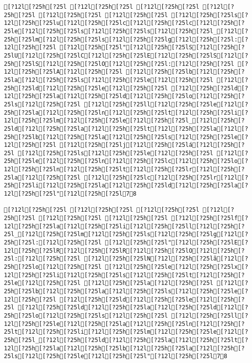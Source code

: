 \documentclass{scrartcl}
\begin{document}
\begin{Verbatim}
[?12l[?25h[?25l [?12l[?25h[?25l [?12l[?25h[?25l [?12l[?25h[?25l [?12l[?25h[?25l [?12l[?25h[?25l [?12l[?25h[?25ls[?12l[?25h[?25lu[?12l[?25h[?25lc[?12l[?25h[?25lc[?12l[?25h[?25le[?12l[?25h[?25ls[?12l[?25h[?25ls[?12l[?25h[?25l_[?12l[?25h[?25lm[?12l[?25h[?25ls[?12l[?25h[?25lg[?12l[?25h[?25l:[?12l[?25h[?25l [?12l[?25h[?25l"[?12l[?25h[?25lS[?12l[?25h[?25lU[?12l[?25h[?25lC[?12l[?25h[?25lE[?12l[?25h[?25lS[?12l[?25h[?25lS[?12l[?25h[?25lO[?12l[?25h[?25l:[?12l[?25h[?25l [?12l[?25h[?25lA[?12l[?25h[?25l [?12l[?25h[?25lb[?12l[?25h[?25la[?12l[?25h[?25ls[?12l[?25h[?25le[?12l[?25h[?25l [?12l[?25h[?25ld[?12l[?25h[?25le[?12l[?25h[?25l [?12l[?25h[?25ld[?12l[?25h[?25la[?12l[?25h[?25ld[?12l[?25h[?25lo[?12l[?25h[?25ls[?12l[?25h[?25l [?12l[?25h[?25ll[?12l[?25h[?25le[?12l[?25h[?25la[?12l[?25h[?25ln[?12l[?25h[?25lt[?12l[?25h[?25li[?12l[?25h[?25lm[?12l[?25h[?25le[?12l[?25h[?25l_[?12l[?25h[?25ld[?12l[?25h[?25la[?12l[?25h[?25lt[?12l[?25h[?25la[?12l[?25h[?25lb[?12l[?25h[?25la[?12l[?25h[?25ls[?12l[?25h[?25le[?12l[?25h[?25l [?12l[?25h[?25lj[?12l[?25h[?25lá[?12l[?25h[?25l [?12l[?25h[?25ls[?12l[?25h[?25le[?12l[?25h[?25l [?12l[?25h[?25le[?12l[?25h[?25ln[?12l[?25h[?25lc[?12l[?25h[?25lo[?12l[?25h[?25ln[?12l[?25h[?25lt[?12l[?25h[?25lr[?12l[?25h[?25la[?12l[?25h[?25l [?12l[?25h[?25lc[?12l[?25h[?25lr[?12l[?25h[?25li[?12l[?25h[?25la[?12l[?25h[?25ld[?12l[?25h[?25la[?12l[?25h[?25l"[?12l[?25h[?25l78

[?12l[?25h[?25l [?12l[?25h[?25l [?12l[?25h[?25l [?12l[?25h[?25l [?12l[?25h[?25l [?12l[?25h[?25l [?12l[?25h[?25lf[?12l[?25h[?25la[?12l[?25h[?25li[?12l[?25h[?25ll[?12l[?25h[?25l_[?12l[?25h[?25lm[?12l[?25h[?25ls[?12l[?25h[?25lg[?12l[?25h[?25l:[?12l[?25h[?25l [?12l[?25h[?25l"[?12l[?25h[?25lE[?12l[?25h[?25lR[?12l[?25h[?25lR[?12l[?25h[?25lO[?12l[?25h[?25l:[?12l[?25h[?25l [?12l[?25h[?25lN[?12l[?25h[?25lã[?12l[?25h[?25lo[?12l[?25h[?25l [?12l[?25h[?25le[?12l[?25h[?25lx[?12l[?25h[?25li[?12l[?25h[?25ls[?12l[?25h[?25lt[?12l[?25h[?25le[?12l[?25h[?25l [?12l[?25h[?25la[?12l[?25h[?25l [?12l[?25h[?25lb[?12l[?25h[?25la[?12l[?25h[?25ls[?12l[?25h[?25le[?12l[?25h[?25l [?12l[?25h[?25ld[?12l[?25h[?25le[?12l[?25h[?25l [?12l[?25h[?25ld[?12l[?25h[?25la[?12l[?25h[?25ld[?12l[?25h[?25lo[?12l[?25h[?25ls[?12l[?25h[?25l [?12l[?25h[?25ll[?12l[?25h[?25le[?12l[?25h[?25la[?12l[?25h[?25ln[?12l[?25h[?25lt[?12l[?25h[?25li[?12l[?25h[?25lm[?12l[?25h[?25le[?12l[?25h[?25l_[?12l[?25h[?25ld[?12l[?25h[?25la[?12l[?25h[?25lt[?12l[?25h[?25la[?12l[?25h[?25lb[?12l[?25h[?25la[?12l[?25h[?25ls[?12l[?25h[?25le[?12l[?25h[?25l"[?12l[?25h[?25l78


\end{Verbatim}
\end{document}
